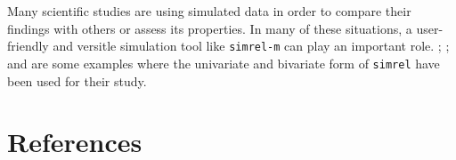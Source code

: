 \documentclass[12pt,A4paper,authoryear]{elsarticle} %
\theoremstyle{definition}
\theoremstyle{definition}
\theoremstyle{remark}
\begin{document}
Many scientific studies
\citep{helland2012near, saebo2008lpls, cook2015simultaneous} are using
simulated data in order to compare their findings with others or assess
its properties. In many of these situations, a user-friendly and
versitle simulation tool like \texttt{simrel-m} can play an important
role. \citet{gangsei2016theoretical}; \citet{gangsei2016linear}; and
\citet{saebo2015simrel} are some examples where the univariate and
bivariate form of \texttt{simrel} have been used for their study.

\section*{References}\label{references}


\renewcommand\refname{References}

\end{document}
